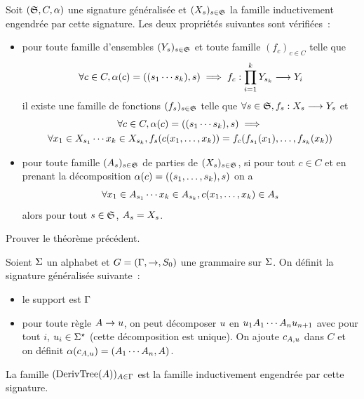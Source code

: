 \begin{theorem}\label{thm.ind.rec.gen}
  Soit $(\mathfrak{S},C,\alpha)$ une signature généralisée et $(X_s)_{s\in\mathfrak{S}}$
  la famille inductivement engendrée par cette signature. Les deux propriétés
  suivantes sont vérifiées~:
  \begin{itemize}
  \item pour toute famille d'ensembles $(Y_s)_{s\in\mathfrak{S}}$ et toute famille
    $(f_c)_{c\in C}$ telle que
    \[\forall c \in C, \alpha(c) = ((s_1\cdots s_k),s) \implies
    f_c : \displaystyle \prod_{i = 1}^k Y_{s_k} \longrightarrow Y_i\]
    il existe une famille de fonctions $(f_s)_{s\in\mathfrak{S}}$ telle que
    $\forall s \in \mathfrak{S}, f_s : \displaystyle X_s \longrightarrow Y_s$ et
    \begin{multline*}
    \forall c \in C, \alpha(c) = ((s_1\cdots s_k),s) \implies\\
    \forall x_1 \in X_{s_1}\cdots x_k\in X_{s_k},
    f_s(c(x_1,\ldots,x_k)) = f_c(f_{s_1}(x_1),\ldots,f_{s_k}(x_k))
    \end{multline*}
  \item pour toute famille $(A_s)_{s\in \mathfrak{S}}$ de parties de
    $(X_s)_{s\in\mathfrak{S}}$, si pour tout $c \in C$ et en prenant la décomposition
    $\alpha(c) = ((s_1,\ldots,s_k),s)$ on a
    \[\forall x_1\in A_{s_1}\cdots x_k\in A_{s_k},
    c(x_1,\ldots,x_k) \in A_s\]
    alors pour tout $s \in \mathfrak{S}$, $A_s = X_s$.
  \end{itemize}
\end{theorem}

\begin{exercise}
  Prouver le théorème précédent.
\end{exercise}

\begin{definition}
  Soient $\Sigma$ un alphabet et $G = (\Gamma,\to,S_{0})$ une grammaire sur
  $\Sigma$.
  On définit la signature généralisée suivante~:
  \begin{itemize}
  \item le support est $\Gamma$
  \item pour toute règle $A \to u$, on peut décomposer $u$ en
    $u_1A_1\cdots A_{n}u_{n+1}$ avec pour tout $i$,
    $u_i \in \Sigma^{\star}$ (cette décomposition est unique). On ajoute
    $c_{A,u}$ dans $C$ et on définit
    $\alpha(c_{A,u}) = (A_1\cdots A_n,A)$.
  \end{itemize}
  La famille $(\operatorname{DerivTree}(A))_{A\in\Gamma}$ est la famille inductivement
  engendrée par cette signature.
\end{definition}

